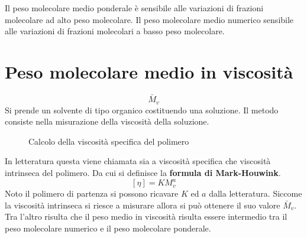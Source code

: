Il peso molecolare medio ponderale è sensibile alle variazioni di frazioni molecolare ad alto peso molecolare.
Il peso molecolare medio numerico sensibile alle variazioni di frazioni molecolari a basso peso molecolare.

\section{Peso molecolare medio in viscosità}
\begin{equation}
\bar{M}_v
\end{equation}
Si prende un solvente di tipo organico costituendo una soluzione. Il metodo consiste nella misurazione della viscosità della soluzione.

\begin{figure}
\centering
{}\quad
{}
\caption{Calcolo della viscosità specifica del polimero}
\label{def:ViscSpec}
\end{figure}
In letteratura questa viene chiamata sia a viscosità specifica che viscosità intrinseca del polimero.
Da cui si definisce la \textbf{formula di Mark-Houwink}.
\begin{equation}
\left[\eta\right] = KM_v^a
\label{eqn:MarkHounwink}
\end{equation}
Noto il polimero di partenza si possono ricavare $K$ ed $a$ dalla letteratura.
Siccome la viscosità intrinseca si riesce a misurare allora si può ottenere il suo valore $\bar{M}_v$. Tra l'altro risulta che il peso medio in viscosità risulta essere intermedio tra il peso molecolare numerico e il peso molecolare ponderale.


